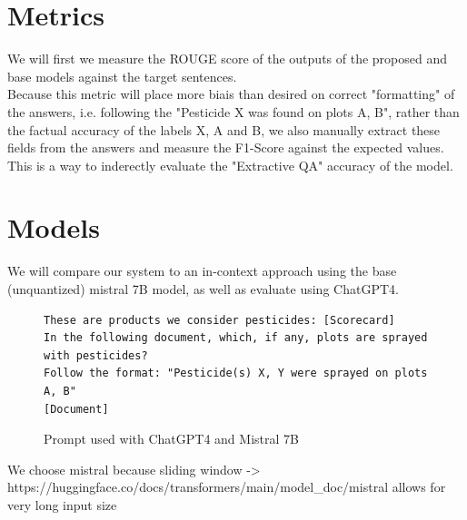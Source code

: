 \documentclass[11pt]{article}
\begin{document}
\section{Metrics} 

We will first we measure the ROUGE score of the outputs of the proposed and base models against the target sentences. \\
Because this metric will place more biais than desired on correct "formatting" of the answers, i.e. following the "Pesticide X was found on plots A, B", rather than the factual accuracy of the labels X, A and B, we also manually extract these fields from the answers and measure the F1-Score against the expected values. This is a way to inderectly evaluate the "Extractive QA" accuracy of the model. 

\section{Models} 

We will compare our system to an in-context approach using the base (unquantized) mistral 7B model, as well as evaluate using ChatGPT4. 
\begin{figure}[]
\begin{verbatim}
These are products we consider pesticides: [Scorecard] 
In the following document, which, if any, plots are sprayed with pesticides? 
Follow the format: "Pesticide(s) X, Y were sprayed on plots A, B"
[Document] 
\end{verbatim}
\caption{Prompt used with ChatGPT4 and Mistral 7B}
\end{figure}
We choose mistral because sliding window -> https://huggingface.co/docs/transformers/main/model_doc/mistral
allows for very long input size
\end{document}
